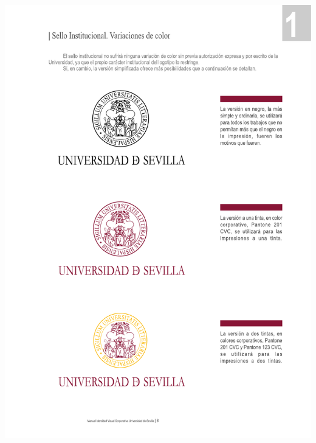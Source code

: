 \documentclass[a4paper,10pt]{article}
\begin{document}
\begin{minipage}{0.3\textwidth}
    \includegraphics[scale=.6]{logo.pdf}
\end{minipage}
\begin{minipage}{0.8\textwidth}
    \begin{center}
        \setlength{\fboxrule}{1pt}
        \setlength{\fboxsep}{2mm}
    \end{center}
\end{minipage}


\vspace{5mm}
\end{document}
